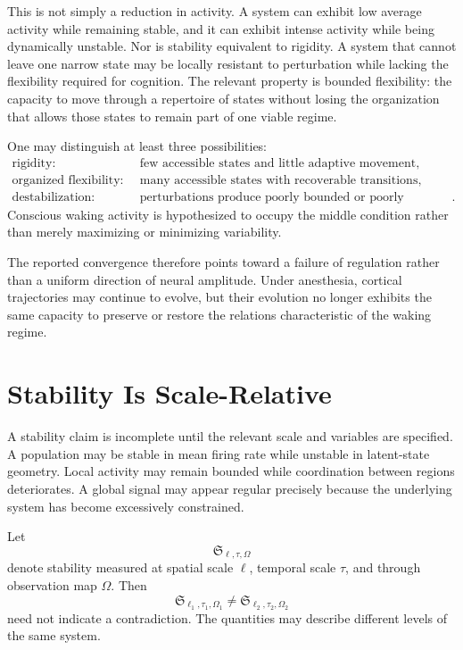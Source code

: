 \documentclass[11pt]{book}
\begin{document}
This is not simply a reduction in activity. A system can exhibit low average activity while remaining stable, and it can exhibit intense activity while being dynamically unstable. Nor is stability equivalent to rigidity. A system that cannot leave one narrow state may be locally resistant to perturbation while lacking the flexibility required for cognition. The relevant property is bounded flexibility: the capacity to move through a repertoire of states without losing the organization that allows those states to remain part of one viable regime.

One may distinguish at least three possibilities:
\[
\begin{aligned}
\text{rigidity:}\quad&
\text{few accessible states and little adaptive movement},
\\
\text{organized flexibility:}\quad&
\text{many accessible states with recoverable transitions},
\\
\text{destabilization:}\quad&
\text{perturbations produce poorly bounded or poorly recoverable motion}.
\end{aligned}
\]
Conscious waking activity is hypothesized to occupy the middle condition rather than merely maximizing or minimizing variability.

The reported convergence therefore points toward a failure of regulation rather than a uniform direction of neural amplitude. Under anesthesia, cortical trajectories may continue to evolve, but their evolution no longer exhibits the same capacity to preserve or restore the relations characteristic of the waking regime.

\section*{Stability Is Scale-Relative}

A stability claim is incomplete until the relevant scale and variables are specified. A population may be stable in mean firing rate while unstable in latent-state geometry. Local activity may remain bounded while coordination between regions deteriorates. A global signal may appear regular precisely because the underlying system has become excessively constrained.

Let
\[
\mathfrak S_{\ell,\tau,\Omega}
\]
denote stability measured at spatial scale $\ell$, temporal scale $\tau$, and through observation map $\Omega$. Then
\[
\mathfrak S_{\ell_1,\tau_1,\Omega_1}
\neq
\mathfrak S_{\ell_2,\tau_2,\Omega_2}
\]
need not indicate a contradiction. The quantities may describe different levels of the same system.
\end{document}
